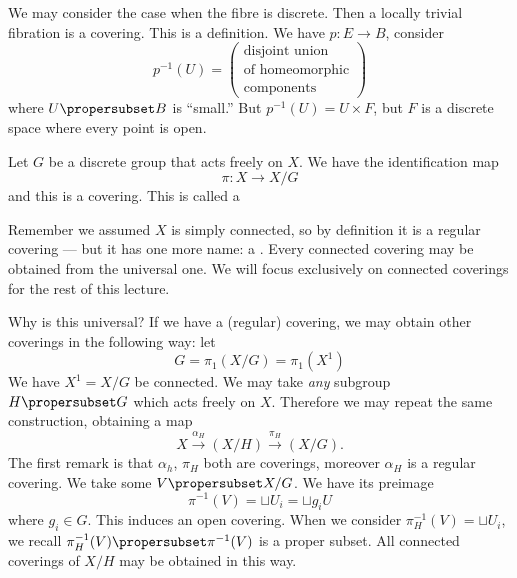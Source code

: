 We may consider the case when the fibre is discrete. Then a
locally trivial fibration is a covering.
This is a definition. We have $p\colon E\to B$, consider
\begin{equation}
p^{-1}(U)=\begin{pmatrix}
\mbox{disjoint union}\\
\mbox{of homeomorphic}\\
\mbox{components}
\end{pmatrix}
\end{equation}
where $U\propersubset B$ is ``small.'' But $p^{-1}(U)=U\times F$,
but $F$ is a discrete space where every point is open. 

\begin{ex}
Let $G$ be a discrete group that acts freely on $X$. We have the
identification map
\begin{equation}
\pi\colon X\to X/G
\end{equation}
and this is a covering. This is called a 
\end{ex}
Remember we assumed $X$ is simply connected, so by definition it
is a regular covering --- but it has one more name: a
.
Every connected covering may be obtained from the universal
one. We will focus exclusively on connected coverings for the rest
of this lecture.

Why is this universal? If we have a (regular) covering, we may
obtain other coverings in the following way: let 
\begin{equation}
G=\pi_{1}(X/G)=\pi_{1}(X^{1})
\end{equation}
We have $X^{1}=X/G$ be connected. We may take \emph{any}
subgroup $H\propersubset G$ which acts freely on $X$. Therefore
we may repeat the same construction, obtaining a map
\begin{equation}
X\xrightarrow{\alpha_{H}}(X/H)\xrightarrow{\pi_{H}}(X/G).
\end{equation}
The first remark is that $\alpha_h$, $\pi_H$ both are coverings,
moreover $\alpha_H$ is a regular covering. We take some
$V\propersubset X/G$. We have its preimage
\begin{equation}
\pi^{-1}(V)=\sqcup U_{i} = \sqcup g_{i}U
\end{equation}
where $g_i\in G$. This induces an open covering. When we consider
$\pi^{-1}_{H}(V)=\sqcup U_{i}$, we recall
$\pi^{-1}_{H}(V)\propersubset\pi^{-1}(V)$ is a proper subset. All
connected coverings of $X/H$ may be obtained in this way.

